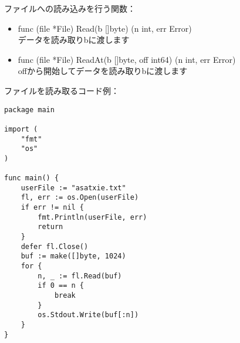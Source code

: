 ファイルへの読み込みを行う関数：

\begin{itemize}
  \item func (file *File) Read(b []byte) (n int, err Error)\\ データを読み取りbに渡します
  \item func (file *File) ReadAt(b []byte, off int64) (n int, err Error)\\ offから開始してデータを読み取りbに渡します
\end{itemize}

ファイルを読み取るコード例：

\begin{lstlisting}[numbers=none]
package main

import (
    "fmt"
    "os"
)

func main() {
    userFile := "asatxie.txt"
    fl, err := os.Open(userFile)        
    if err != nil {
        fmt.Println(userFile, err)
        return
    }
    defer fl.Close()
    buf := make([]byte, 1024)
    for {
        n, _ := fl.Read(buf)
        if 0 == n {
            break
        }
        os.Stdout.Write(buf[:n])
    }
}
\end{lstlisting}
